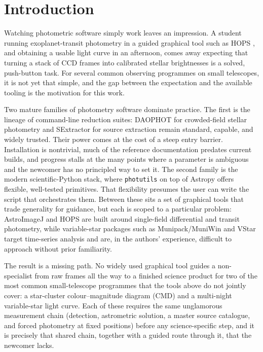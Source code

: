 \documentclass[fleqn,usenatbib]{mnras}
\begin{document}
\section{Introduction}
\label{sec:intro}

Watching photometric software simply work leaves an impression. A student running exoplanet-transit photometry in a guided graphical tool such as HOPS \citep{tsiaras2019}, and obtaining a usable light curve in an afternoon, comes away expecting that turning a stack of CCD frames into calibrated stellar brightnesses is a solved, push-button task. For several common observing programmes on small telescopes, it is not yet that simple, and the gap between the expectation and the available tooling is the motivation for this work.

Two mature families of photometry software dominate practice. The first is the lineage of command-line reduction suites: DAOPHOT for crowded-field stellar photometry \citep{stetson1987} and SExtractor for source extraction \citep{bertin1996} remain standard, capable, and widely trusted. Their power comes at the cost of a steep entry barrier. Installation is nontrivial, much of the reference documentation predates current builds, and progress stalls at the many points where a parameter is ambiguous and the newcomer has no principled way to set it. The second family is the modern scientific-Python stack, where \texttt{photutils} \citep{photutils} on top of Astropy \citep{astropy2013, astropy2018, astropy2022} offers flexible, well-tested primitives. That flexibility presumes the user can write the script that orchestrates them. Between these sits a set of graphical tools that trade generality for guidance, but each is scoped to a particular problem: AstroImageJ \citep{collins2017} and HOPS \citep{tsiaras2019} are built around single-field differential and transit photometry, while variable-star packages such as Munipack/MuniWin \citep{hroch2014} and VStar \citep{benn2012} target time-series analysis and are, in the authors' experience, difficult to approach without prior familiarity.

The result is a missing path. No widely used graphical tool guides a non-specialist from raw frames all the way to a finished science product for two of the most common small-telescope programmes that the tools above do not jointly cover: a star-cluster colour--magnitude diagram (CMD) and a multi-night variable-star light curve. Each of these requires the same unglamorous measurement chain (detection, astrometric solution, a master source catalogue, and forced photometry at fixed positions) before any science-specific step, and it is precisely that shared chain, together with a guided route through it, that the newcomer lacks.
\end{document}
